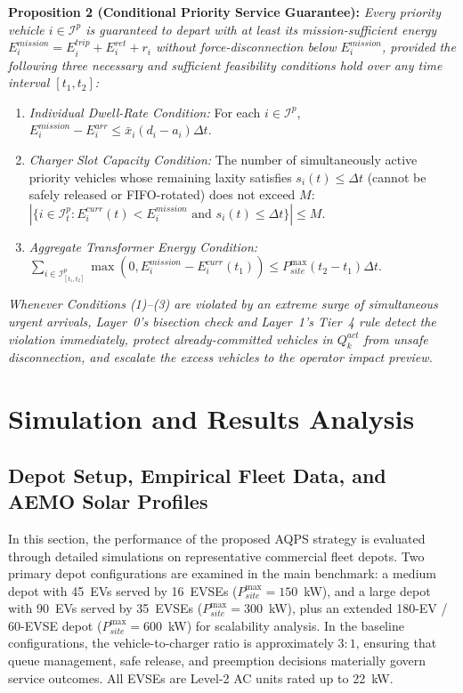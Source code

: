 \documentclass[final,3p,times,twocolumn]{elsarticle}
\begin{document}
\textbf{Proposition 2 (Conditional Priority Service Guarantee):} \textit{Every priority vehicle $i \in \mathcal{I}^p$ is guaranteed to depart with at least its mission-sufficient energy $E_i^{mission} = E_i^{trip} + E_i^{ret} + r_i$ without force-disconnection below $E_i^{mission}$, provided the following three necessary and sufficient feasibility conditions hold over any time interval $[t_1, t_2]$:}
\begin{enumerate}
    \item \textit{Individual Dwell-Rate Condition:} For each $i \in \mathcal{I}^p$, $E_i^{mission} - E_i^{arr} \le \bar{x}_i (d_i - a_i)\Delta t$.
    \item \textit{Charger Slot Capacity Condition:} The number of simultaneously active priority vehicles whose remaining laxity satisfies $s_i(t) \le \Delta t$ (cannot be safely released or FIFO-rotated) does not exceed $M$: $|\{i \in \mathcal{I}_t^p : E_i^{curr}(t) < E_i^{mission} \text{ and } s_i(t) \le \Delta t\}| \le M$.
    \item \textit{Aggregate Transformer Energy Condition:} $\sum_{i \in \mathcal{I}_{[t_1,t_2]}^p} \max(0, E_i^{mission} - E_i^{curr}(t_1)) \le P_{site}^{\max} (t_2 - t_1)\Delta t$.
\end{enumerate}
\textit{Whenever Conditions (1)--(3) are violated by an extreme surge of simultaneous urgent arrivals, Layer~0's bisection check and Layer~1's Tier~4 rule detect the violation immediately, protect already-committed vehicles in $Q_k^{act}$ from unsafe disconnection, and escalate the excess vehicles to the operator impact preview.}

\section{Simulation and Results Analysis}
\label{sec:results}

\subsection{Depot Setup, Empirical Fleet Data, and AEMO Solar Profiles}
\label{sec:setup}

In this section, the performance of the proposed AQPS strategy is evaluated through detailed simulations on representative commercial fleet depots. Two primary depot configurations are examined in the main benchmark: a medium depot with 45~EVs served by 16~EVSEs ($P_{site}^{\max} = 150$~kW), and a large depot with 90~EVs served by 35~EVSEs ($P_{site}^{\max} = 300$~kW), plus an extended 180-EV / 60-EVSE depot ($P_{site}^{\max} = 600$~kW) for scalability analysis. In the baseline configurations, the vehicle-to-charger ratio is approximately $3:1$, ensuring that queue management, safe release, and preemption decisions materially govern service outcomes. All EVSEs are Level-2 AC units rated up to 22~kW.
\end{document}
